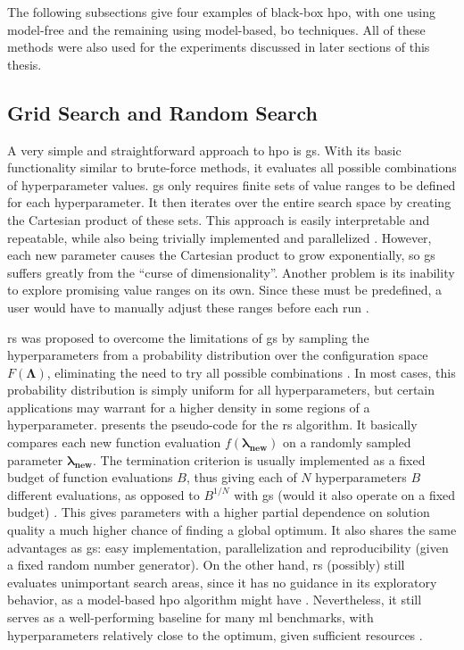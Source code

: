 The following subsections give four examples of black-box \gls{hpo}, with one using model-free and the remaining using model-based, \gls{bo} techniques. All of these methods were also used for the experiments discussed in later sections of this thesis.

\subsection{Grid Search and Random Search}

A very simple and straightforward approach to \gls{hpo} is \gls{gs}. With its basic functionality similar to brute-force methods, it evaluates all possible combinations of hyperparameter values. \gls{gs} only requires finite sets of value ranges to be defined for each hyperparameter. It then iterates over the entire search space by creating the Cartesian product of these sets. This approach is easily interpretable and repeatable, while also being trivially implemented and parallelized \cite{bergstra2012random}. However, each new parameter causes the Cartesian product to grow exponentially, so \gls{gs} suffers greatly from the \enquote{curse of dimensionality}. Another problem is its inability to explore promising value ranges on its own. Since these must be predefined, a user would have to manually adjust these ranges before each run \cite{yang2020hyperparameter}.

\gls{rs} was proposed to overcome the limitations of \gls{gs} by sampling the hyperparameters from a probability distribution over the configuration space $F(\mathbf{\Lambda})$, eliminating the need to try all possible combinations \cite{bergstra2012random}. In most cases, this probability distribution is simply uniform for all hyperparameters, but certain applications may warrant for a higher density in some regions of a hyperparameter.  presents the pseudo-code for the \gls{rs} algorithm. It basically compares each new function evaluation $f(\mathbf{\lambda_{\text{new}}})$ on a randomly sampled parameter $\mathbf{\lambda_{\text{new}}}$. The termination criterion is usually implemented as a fixed budget of function evaluations $B$, thus giving each of $N$ hyperparameters $B$ different evaluations, as opposed to $B^{1/N}$ with \gls{gs} (would it also operate on a fixed budget) \cite{bergstra2012random}. This gives parameters with a higher partial dependence on solution quality a much higher chance of finding a global optimum. It also shares the same advantages as \gls{gs}: easy implementation, parallelization and reproducibility (given a fixed random number generator). On the other hand, \gls{rs} (possibly) still evaluates unimportant search areas, since it has no guidance in its exploratory behavior, as a model-based \gls{hpo} algorithm might have \cite{yang2020hyperparameter}.
Nevertheless, it still serves as a well-performing baseline for many \gls{ml} benchmarks, with hyperparameters relatively close to the optimum, given sufficient resources \cite{feurer2019hyperparameter}.


